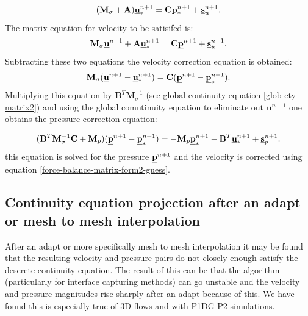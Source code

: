 \begin{equation}
({\mathbf M}_\sigma +{\mathbf A}) \underline{\bf u}^{n+1}_* = {\mathbf C} {\bf p}^{n+1}_* + \underline{\bf s}_u^{n+1}. 
\label{force-balance-matrix-form2-guess}
\end{equation}
The matrix equation for velocity to be satisifed is: 
\begin{equation}
{\mathbf M}_\sigma\underline{\bf u}^{n+1} +{\mathbf A} \underline{\bf u}^{n+1}_* = {\mathbf C} \underline{\bf p}^{n+1} + \underline{\bf s}_u^{n+1}. 
\label{force-balance-matrix-form2-guess-2}
\end{equation}
Subtracting these two equations the   
velocity correction equation is obtained:
\begin{equation}
{\mathbf M}_\sigma ( \underline{\bf u}^{n+1} -\underline{\bf u}^{n+1}_*) 
= {\mathbf C} (\underline{\bf p}^{n+1} - \underline{\bf p}^{n+1}_*). 
\label{force-balance-matrix-form2-guess}
\end{equation}
Multiplying this equation by ${\mathbf B}^T {\mathbf M}_\sigma^{-1}$ 
(see global continuity 
equation \ref{glob-cty-matrix2}) and using the global comntinuity 
equation to eliminate out $ \underline{\mathbf u}^{n+1} $ one obtains 
the pressure correction equation:

\begin{equation}
({\mathbf B}^T {\mathbf M}_\sigma^{-1} {\mathbf C} + {\mathbf M}_p) (\underline{\bf p}^{n+1} - \underline{\bf p}^{n+1}_*) 
= - {\mathbf M}_p \underline{\bf p}^{n+1}_* - {\mathbf B}^T \underline{\bf u}^{n+1}_* + \underline{\bf s}_p^{n+1}.
\end{equation}
this equation is solved for the pressure  $\underline{\bf p}^{n+1}$ and the 
velocity is corrected using equation \ref{force-balance-matrix-form2-guess}.


\subsection{Continuity equation projection after an adapt or mesh to mesh interpolation} 

After an adapt or more specifically mesh to mesh interpolation it may be found that the 
resulting velocity and pressure pairs do not closely enough satisfy the descrete continuity equation. 
The result of this can be that the algorithm (particularly for interface capturing methods) 
can go unstable and the velocity and pressure magnitudes rise sharply after an adapt because of this. We have found this is especially true of 3D flows and with P1DG-P2 simulations. 

